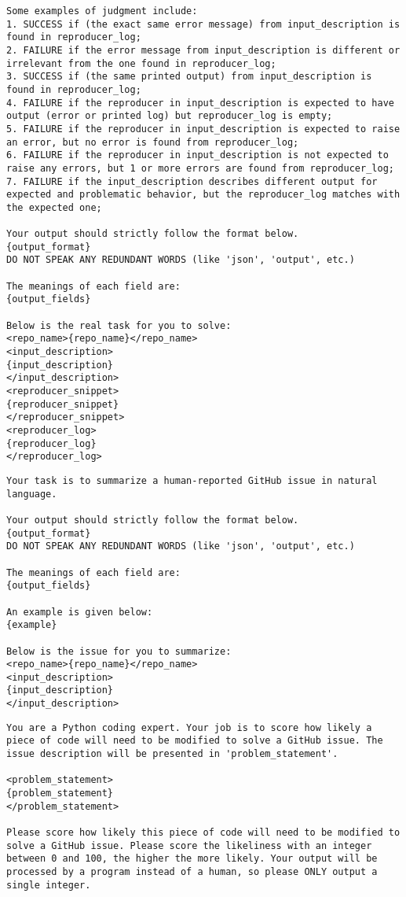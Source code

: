 \begin{tcolorbox}[
    colback=white,
    colframe=searchpurple,
    title=Extractor Agent Prompt,
    breakable
]
\begin{lstlisting}
Some examples of judgment include:
1. SUCCESS if (the exact same error message) from input_description is found in reproducer_log;
2. FAILURE if the error message from input_description is different or irrelevant from the one found in reproducer_log;
3. SUCCESS if (the same printed output) from input_description is found in reproducer_log;
4. FAILURE if the reproducer in input_description is expected to have output (error or printed log) but reproducer_log is empty;
5. FAILURE if the reproducer in input_description is expected to raise an error, but no error is found from reproducer_log;
6. FAILURE if the reproducer in input_description is not expected to raise any errors, but 1 or more errors are found from reproducer_log;
7. FAILURE if the input_description describes different output for expected and problematic behavior, but the reproducer_log matches with the expected one;

Your output should strictly follow the format below.
{output_format}
DO NOT SPEAK ANY REDUNDANT WORDS (like 'json', 'output', etc.)

The meanings of each field are:
{output_fields}

Below is the real task for you to solve:
<repo_name>{repo_name}</repo_name>
<input_description>
{input_description}
</input_description>
<reproducer_snippet>
{reproducer_snippet}
</reproducer_snippet>
<reproducer_log>
{reproducer_log}
</reproducer_log>
\end{lstlisting}

\begin{lstlisting}
Your task is to summarize a human-reported GitHub issue in natural language.

Your output should strictly follow the format below.
{output_format}
DO NOT SPEAK ANY REDUNDANT WORDS (like 'json', 'output', etc.)

The meanings of each field are:
{output_fields}

An example is given below:
{example}

Below is the issue for you to summarize:
<repo_name>{repo_name}</repo_name>
<input_description>
{input_description}
</input_description>
\end{lstlisting}

\begin{lstlisting}
You are a Python coding expert. Your job is to score how likely a piece of code will need to be modified to solve a GitHub issue. The issue description will be presented in 'problem_statement'. 

<problem_statement>
{problem_statement}
</problem_statement>

Please score how likely this piece of code will need to be modified to solve a GitHub issue. Please score the likeliness with an integer between 0 and 100, the higher the more likely. Your output will be processed by a program instead of a human, so please ONLY output a single integer.
\end{lstlisting}

\end{tcolorbox}

